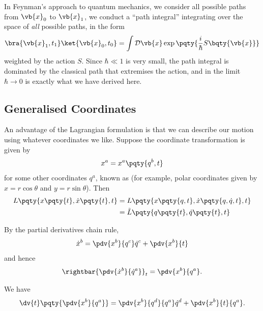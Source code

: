 \begin{remarks}
\begin{enumerate}[label=(\roman*)]
        In Feynman's approach to quantum mechanics, we consider all possible paths from \(\vb{x}_0\) to \(\vb{x}_1\), we conduct a ``path integral'' integrating over the space of \emph{all} possible paths, in the form
        \begin{equation}
            \bra{\vb{x}_1, t_1} \ket{\vb{x}_0, t_0} = \int \mathcal{D}\vb{x} \exp\pqty{\frac{i}{\hbar} S\bqty{\vb{x}}}
        \end{equation}
        weighted by the action \(S\). Since \(\hbar \ll 1\) is very small, the path integral is dominated by the classical path that extremises the action, and in the limit \(\hbar \to 0\) is exactly what we have derived here.
    \end{enumerate}
\end{remarks}

\subsection{Generalised Coordinates}

An advantage of the Lagrangian formulation is that we can describe our motion using whatever coordinates we like. Suppose the coordinate transformation is given by
\begin{equation}
    x^a = x^a \pqty{q^b, t}
\end{equation}
for some other coordinates \(q^a\), known as  (for example, polar coordinates given by \(x = r \cos \theta\) and \(y = r \sin \theta\)). Then
\begin{subequations}
    \begin{align}
        L\pqty{x\pqty{t}, \dot{x}\pqty{t}, t} &= L\pqty{x\pqty{q, t}, \dot{x}\pqty{q, \dot{q}, t}, t} \\
        &= \tilde{L}\pqty{q\pqty{t}, \dot{q}\pqty{t}, t}
    \end{align}
\end{subequations}

By the partial derivatives chain rule,
\begin{equation}
    \label{eq:xdot-chain-rule-in-qdot}%
    \dot{x}^b = \pdv{x^b}{q^c} \dot{q}^c + \pdv{x^b}{t}
\end{equation}
and hence
\begin{equation}
    \label{eq:xdot-qdot-partial}%
    \rightbar{\pdv{\dot{x}^b}{\dot{q}^a}}_{t} = \pdv{x^b}{q^a}.
\end{equation}

We have
\begin{equation}
    \label{eq:x-q-partial-time}%
    \dv{t} \pqty{\pdv{x^b}{q^a}} = \pdv{x^b}{q^d}{q^a} \dot{q}^d + \pdv{x^b}{t}{q^a}.
\end{equation}

